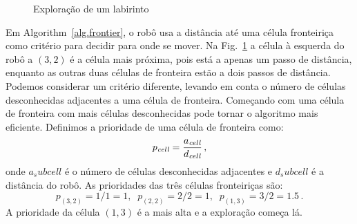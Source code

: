 \begin{figure}
\begin{center}
\caption{Exploração de um labirinto}\label{fig.map-seven}
\end{center}
\end{figure}

Em Algorithm~\ref{alg.frontier}, o robô usa a distância até uma célula fronteiriça como critério para decidir para onde se mover. Na Fig.~\ref{fig.map-seven} a célula à esquerda do robô a $(3,2)$ é a célula mais próxima, pois está a apenas um passo de distância, enquanto as outras duas células de fronteira estão a dois passos de distância. Podemos considerar um critério diferente, levando em conta o número de células desconhecidas adjacentes a uma célula de fronteira. Começando com uma célula de fronteira com mais células desconhecidas pode tornar o algoritmo mais eficiente. Definimos a prioridade de uma célula de fronteira como:
\[
p_{\textit{\scriptsize cell}} = \frac{a_{\textit{\scriptsize cell}}}{d_{\textit{\scriptsize cell}}}\,,
\]
onde $a_sub{cell}$ é o número de células desconhecidas adjacentes e $d_sub{cell}$ é a distância do robô. As prioridades das três células fronteiriças são:
\[
p_{(3,2)} = 1/1 = 1,\;\;p_{(2,2)} = 2/2 = 1,\;\;p_{(1,3)} = 3/2 = 1.5\,.
\]
A prioridade da célula $(1,3)$ é a mais alta e a exploração começa lá.

